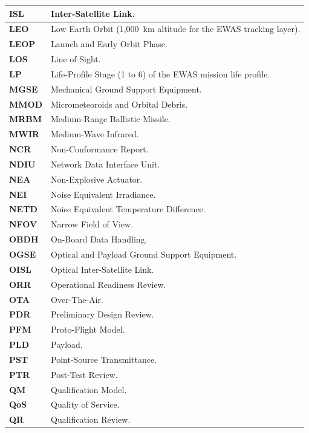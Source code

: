 {\begin{longtable}{|>{\raggedright\arraybackslash}p{3.2cm}|>{\raggedright\arraybackslash}p{12.2cm}|}
\textbf{ISL} & Inter-Satellite Link. \\ \hline
\textbf{LEO} & Low Earth Orbit (1,000~km altitude for the EWAS tracking layer). \\ \hline
\textbf{LEOP} & Launch and Early Orbit Phase. \\ \hline
\textbf{LOS} & Line of Sight. \\ \hline
\textbf{LP} & Life-Profile Stage (1 to 6) of the EWAS mission life profile. \\ \hline
\textbf{MGSE} & Mechanical Ground Support Equipment. \\ \hline
\textbf{MMOD} & Micrometeoroids and Orbital Debris. \\ \hline
\textbf{MRBM} & Medium-Range Ballistic Missile. \\ \hline
\textbf{MWIR} & Medium-Wave Infrared. \\ \hline
\textbf{NCR} & Non-Conformance Report. \\ \hline
\textbf{NDIU} & Network Data Interface Unit. \\ \hline
\textbf{NEA} & Non-Explosive Actuator. \\ \hline
\textbf{NEI} & Noise Equivalent Irradiance. \\ \hline
\textbf{NETD} & Noise Equivalent Temperature Difference. \\ \hline
\textbf{NFOV} & Narrow Field of View. \\ \hline
\textbf{OBDH} & On-Board Data Handling. \\ \hline
\textbf{OGSE} & Optical and Payload Ground Support Equipment. \\ \hline
\textbf{OISL} & Optical Inter-Satellite Link. \\ \hline
\textbf{ORR} & Operational Readiness Review. \\ \hline
\textbf{OTA} & Over-The-Air. \\ \hline
\textbf{PDR} & Preliminary Design Review. \\ \hline
\textbf{PFM} & Proto-Flight Model. \\ \hline
\textbf{PLD} & Payload. \\ \hline
\textbf{PST} & Point-Source Transmittance. \\ \hline
\textbf{PTR} & Post-Test Review. \\ \hline
\textbf{QM} & Qualification Model. \\ \hline
\textbf{QoS} & Quality of Service. \\ \hline
\textbf{QR} & Qualification Review. \\ \hline

\end{longtable}}
